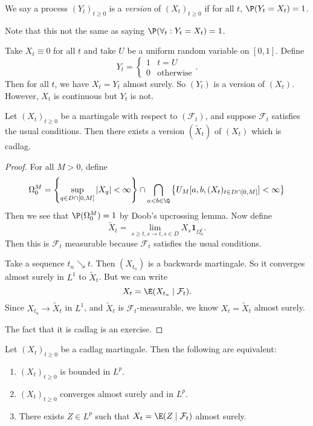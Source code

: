 \documentclass[a4paper]{article}
\begin{document}
\begin{defi}[Version]
  We say a process $(Y_t)_{t \geq 0}$ is a \emph{version} of $(X_t)_{t \geq 0}$ if for all $t$, $\P(Y_t = X_t) = 1$.
\end{defi}

Note that this not the same as saying $\P(\forall_t :Y_t = X_t) = 1$.

\begin{eg}
  Take $X_t \equiv 0$ for all $t$ and take $U$ be a uniform random variable on $[0, 1]$. Define
  \[
    Y_t =
    \begin{cases}
      1 & t = U\\
      0 & \text{otherwise}
    \end{cases}.
  \]
  Then for all $t$, we have $X_t = Y_t$ almost surely. So $(Y_t)$ is a version of $(X_t)$. However, $X_t$ is continuous but $Y_t$ is not.
\end{eg}
\begin{thm}
  Let $(X_t)_{t \geq 0}$ be a martingale with respect to $(\mathcal{F}_t)$, and suppose $\mathcal{F}_t$ satisfies the usual conditions. Then there exists a version $(\tilde{X}_t)$ of $(X_t)$ which is cadlag.
\end{thm}

\begin{proof}
  For all $M > 0$, define
  \[
    \Omega_0^M = \left\{\sup_{q \in D \cap [0, M]} |X_q| < \infty\right\} \cap \bigcap_{a < b \in \Q} \left\{U_M[a, b, (X_t)_{t \in D \cap [0, M]}] < \infty\right\}
  \]
  Then we see that $\P(\Omega_0^M) = 1$ by Doob's upcrossing lemma. Now define
  \[
    \tilde{X}_t = \lim_{s \geq t, s \to t, s \in D} X_s \mathbf{1}_{\Omega^t_0}.
  \]
  Then this is $\mathcal{F}_t$ measurable because $\mathcal{F}_t$ satisfies the usual conditions.

  Take a sequence $t_n \searrow t$. Then $(X_{t_n})$ is a backwards martingale. So it converges almost surely in $L^1$ to $\tilde{X}_t$. But we can write
  \[
    X_t = \E (X_{t_n} \mid \mathcal{F}_t).
  \]
  Since $X_{t_n} \to \tilde{X}_t$ in $L^1$, and $\tilde{X}_t$ is $\mathcal{F}_t$-measurable, we know $X_t = \tilde{X}_t$ almost surely.

  The fact that it is cadlag is an exercise.
\end{proof}

\begin{thm}
  Let $(X_t)_{t \geq 0}$ be a cadlag martingale. Then the following are equivalent:
  \begin{enumerate}
    \item $(X_t)_{t \geq 0}$ is bounded in $L^p$.
    \item $(X_t)_{t \geq 0}$ converges almost surely and in $L^p$.
    \item There exists $Z \in L^p$ such that $X_t = \E (Z \mid \mathcal{F}_t)$ almost surely.
  \end{enumerate}
\end{thm}
\end{document}
